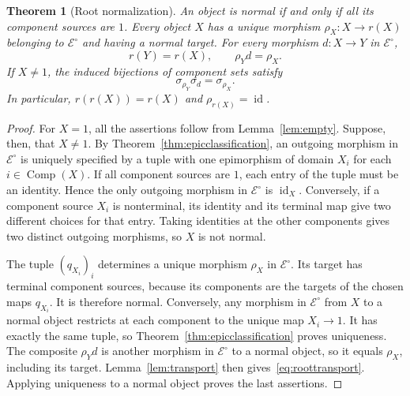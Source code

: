 \documentclass[11pt,a4paper]{article}
\theoremstyle{plain}
\newtheorem{theorem}{Theorem}[section]
\theoremstyle{definition}
\theoremstyle{remark}
\newcommand{\Icat}{\mathcal E^\circ}
\newcommand{\one}{1}
\newcommand{\id}{\operatorname{id}}
\newcommand{\Comp}{\operatorname{Comp}}
\begin{document}
\begin{theorem}[Root normalization]\label{thm:root}
An object is normal if and only if all its component sources
are $\one$. Every object $X$ has a unique morphism
$\rho_X:X\to r(X)$ belonging to $\Icat$ and having a normal
target. For every morphism $d:X\to Y$ in $\Icat$,
\begin{equation}\label{eq:rootlaws}
r(Y)=r(X),\qquad \rho_Yd=\rho_X.
\end{equation}
If $X\ne\one$, the induced bijections of component sets satisfy
\begin{equation}\label{eq:roottransport}
 \sigma_{\rho_Y}\sigma_d=\sigma_{\rho_X}.
\end{equation}
In particular, $r(r(X))=r(X)$ and $\rho_{r(X)}=\id$.
\end{theorem}
\begin{proof}
For $X=\one$, all the assertions follow from
Lemma~\ref{lem:empty}. Suppose, then, that $X\ne\one$.
By Theorem~\ref{thm:epicclassification}, an outgoing
morphism in $\Icat$ is uniquely specified by a tuple with one
epimorphism of domain $X_i$ for each $i\in\Comp(X)$.
If all component sources are $\one$, each entry of the tuple
must be an identity. Hence the only outgoing morphism in
$\Icat$ is $\id_X$. Conversely, if a component source $X_i$
is nonterminal, its identity and its terminal map give two
different choices for that entry. Taking identities at the
other components gives two distinct outgoing morphisms, so
$X$ is not normal.

The tuple $(q_{X_i})_i$ determines a unique morphism $\rho_X$
in $\Icat$.
Its target has terminal component sources, because its
components are the targets of the chosen maps $q_{X_i}$.
It is therefore normal. Conversely, any morphism in $\Icat$
from $X$ to a normal object restricts at each component to
the unique map $X_i\to\one$. It has exactly the same tuple,
so Theorem~\ref{thm:epicclassification} proves uniqueness.
The composite $\rho_Yd$ is another morphism in $\Icat$ to a normal object,
so it equals $\rho_X$, including its target. Lemma~\ref{lem:transport}
then gives~\eqref{eq:roottransport}. Applying uniqueness to a normal
object proves the last assertions.
\end{proof}
\end{document}
